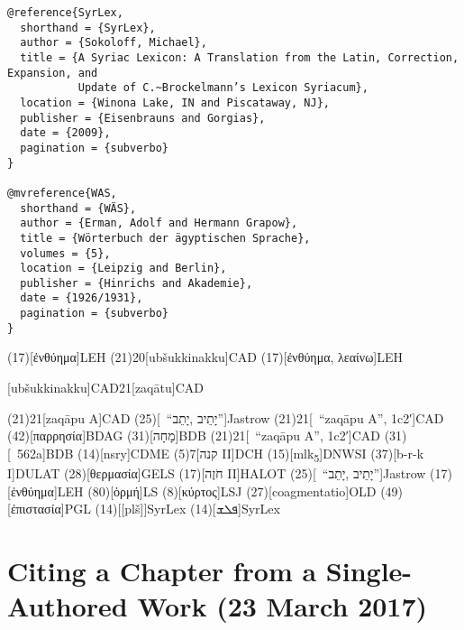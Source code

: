 \documentclass[a4paper]{article}
\begin{document}
\begin{verbatim}
@reference{SyrLex,
  shorthand = {SyrLex},
  author = {Sokoloff, Michael},
  title = {A Syriac Lexicon: A Translation from the Latin, Correction, Expansion, and
           Update of C.~Brockelmann’s Lexicon Syriacum},
  location = {Winona Lake, IN and Piscataway, NJ},
  publisher = {Eisenbrauns and Gorgias},
  date = {2009},
  pagination = {subverbo}
}

@mvreference{WAS,
  shorthand = {WÄS},
  author = {Erman, Adolf and Hermann Grapow},
  title = {Wörterbuch der ägyptischen Sprache},
  volumes = {5},
  location = {Leipzig and Berlin},
  publisher = {Hinrichs and Akademie},
  date = {1926/1931},
  pagination = {subverbo}
}
\end{verbatim}


\examplecite(17)[ἐνθύημα]{LEH}
\examplevolcite(21){20}[ubšukkinakku]{CAD}
\examplecite(17)[ἐνθύημα, λεαίνω]{LEH}
\begin{fverbcite}{21}
  [ubšukkinakku]{CAD}{21}[zaqātu]{CAD}
\end{fverbcite}
\examplevolcite(21){21}[zaqāpu A]{CAD}
\examplecite(25)[\sv~\mkbibquote{יָתֵיב ,יָתֵב}]{Jastrow}
\examplevolcite(21){21}[\sv~\mkbibquote{zaqāpu A}, 1c2′]{CAD}
\examplecite(42)[παρρησία]{BDAG}
\examplecite(31)[מָחָה]{BDB}
\examplevolcite(21){21}[\sv~\mkbibquote{zaqāpu A}, 1c2′]{CAD}
\examplecite(31)[\nopp 562a]{BDB}
\examplecite(14)[nsry]{CDME}
\examplevolcite(5){7}[קנה II]{DCH}
\examplecite(15)[mlk\textsubscript{5}]{DNWSI}
\examplecite(37)[b-r-k I]{DULAT}
\examplecite(28)[θερμασία]{GELS}
\examplecite(17)[חֹזֶה II]{HALOT}
\examplecite(25)[\sv~\mkbibquote{יָתֵיב ,יָתֵב}]{Jastrow}
\examplecite(17)[ἐνθύημα]{LEH}
\examplecite(80)[ὁρμή]{LS}
\examplecite(8)[κύρτος]{LSJ}
\examplecite(27)[coagmentatio]{OLD}
\examplecite(49)[ἐπιστασία]{PGL}
\examplecite(14)[\mkbibbrackets{plš}]{SyrLex}
\examplecite(14)[ܦܠܫ]{SyrLex}
\begin{verbcite}
  \nocite{BAG, BAGD, CHD, HAL, HED, KBL, Lane, LexSyr, WAS}
\end{verbcite}
\exampleabbreviations
{}

\section{Citing a Chapter from a Single-Authored Work (23 March 2017)}
\end{document}
